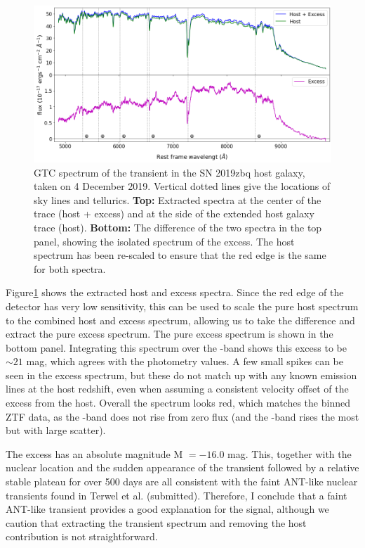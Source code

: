 \documentclass[a4paper,oneside,12pt, class=Latex/Classes/PhDthesisPSnPDF, crop=false]{standalone}
\begin{document}
\begin{figure}
    \centering
    \includegraphics[width=\textwidth]{../Images/chapter_5/2020zbq_spec.png}
    \caption{GTC spectrum of the transient in the SN 2019zbq host galaxy, taken on 4 December 2019. Vertical dotted lines give the locations of sky lines and tellurics. \textbf{Top:} Extracted spectra at the center of the trace (host + excess) and at the side of the extended host galaxy trace (host). \textbf{Bottom:} The difference of the two spectra in the top panel, showing the isolated spectrum of the excess. The host spectrum has been re-scaled to ensure that the red edge is the same for both spectra.}
    \label{2019zbq_spec}
\end{figure}

Figure\ref{2019zbq_spec} shows the extracted host and excess spectra. Since the red edge of the detector has very low sensitivity, this can be used to scale the pure host spectrum to the combined host and excess spectrum, allowing us to take the difference and extract the pure excess spectrum. The pure excess spectrum is shown in the bottom panel. Integrating this spectrum over the \ztfr-band shows this excess to be $\sim21$ mag, which agrees with the photometry values. A few small spikes can be seen in the excess spectrum, but these do not match up with any known emission lines at the host redshift, even when assuming a consistent velocity offset of the excess from the host. Overall the spectrum looks red, which matches the binned ZTF data, as the \ztfg-band does not rise from zero flux (and the \ztfi-band rises the most but with large scatter).

The excess has an absolute magnitude M $=-16.0$ mag. This, together with the nuclear location and the sudden appearance of the transient followed by a relative stable plateau for over 500 days are all consistent with the faint ANT-like nuclear transients found in Terwel et al. (submitted). Therefore, I conclude that a faint ANT-like transient provides a good explanation for the signal, although we caution that extracting the transient spectrum and removing the host contribution is not straightforward.
\end{document}
